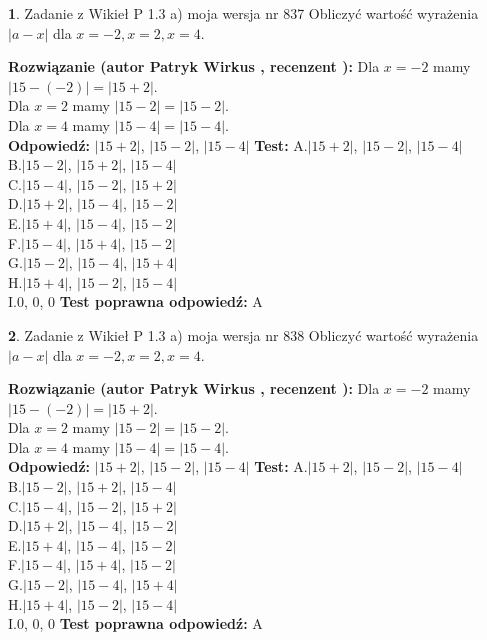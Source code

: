 \documentclass[12pt, a4paper]{article}
\theoremstyle{definition} %
\newtheorem{zad}{}
\newcommand{\zadStart}[1]{\begin{zad}#1\newline}
\newcommand{\zadStop}{\end{zad}}
\newcommand{\rozwStart}[2]{\noindent \textbf{Rozwiązanie (autor #1 , recenzent #2): }\newline}
\newcommand{\rozwStop}{\newline}
\newcommand{\odpStart}{\noindent \textbf{Odpowiedź:}\newline}
\newcommand{\odpStop}{\newline}
\newcommand{\testStart}{\noindent \textbf{Test:}\newline}
\newcommand{\testStop}{\newline}
\newcommand{\kluczStart}{\noindent \textbf{Test poprawna odpowiedź:}\newline}
\newcommand{\kluczStop}{\newline}
\begin{document}
\zadStart{Zadanie z Wikieł P 1.3 a) moja wersja nr 837}
Obliczyć wartość wyrażenia $|a - x|$ dla $x=-2,x=2,x=4$.
\zadStop
\rozwStart{Patryk Wirkus}{}
Dla $x = -2$ mamy $|15 - (-2)| = |15 + 2|$.\\
Dla $x = 2$ mamy $|15 - 2| = |15 - 2|$.\\
Dla $x = 4$ mamy $|15 - 4| = |15 - 4|$.\\
\rozwStop
\odpStart
$|15 + 2|$, $|15 - 2|$, $|15 - 4|$
\odpStop
\testStart
A.$|15 + 2|$, $|15 - 2|$, $|15 - 4|$\\
B.$|15 - 2|$, $|15 + 2|$, $|15 - 4|$\\
C.$|15 - 4|$, $|15 - 2|$, $|15 + 2|$\\
D.$|15 + 2|$, $|15 - 4|$, $|15 - 2|$\\
E.$|15 + 4|$, $|15 - 4|$, $|15 - 2|$\\
F.$|15 - 4|$, $|15 + 4|$, $|15 - 2|$\\
G.$|15 - 2|$, $|15 - 4|$, $|15 + 4|$\\
H.$|15 + 4|$, $|15 - 2|$, $|15 - 4|$\\
I.$0$, $0$, $0$
\testStop
\kluczStart
A
\kluczStop



\zadStart{Zadanie z Wikieł P 1.3 a) moja wersja nr 838}
Obliczyć wartość wyrażenia $|a - x|$ dla $x=-2,x=2,x=4$.
\zadStop
\rozwStart{Patryk Wirkus}{}
Dla $x = -2$ mamy $|15 - (-2)| = |15 + 2|$.\\
Dla $x = 2$ mamy $|15 - 2| = |15 - 2|$.\\
Dla $x = 4$ mamy $|15 - 4| = |15 - 4|$.\\
\rozwStop
\odpStart
$|15 + 2|$, $|15 - 2|$, $|15 - 4|$
\odpStop
\testStart
A.$|15 + 2|$, $|15 - 2|$, $|15 - 4|$\\
B.$|15 - 2|$, $|15 + 2|$, $|15 - 4|$\\
C.$|15 - 4|$, $|15 - 2|$, $|15 + 2|$\\
D.$|15 + 2|$, $|15 - 4|$, $|15 - 2|$\\
E.$|15 + 4|$, $|15 - 4|$, $|15 - 2|$\\
F.$|15 - 4|$, $|15 + 4|$, $|15 - 2|$\\
G.$|15 - 2|$, $|15 - 4|$, $|15 + 4|$\\
H.$|15 + 4|$, $|15 - 2|$, $|15 - 4|$\\
I.$0$, $0$, $0$
\testStop
\kluczStart
A
\kluczStop
\end{document}

